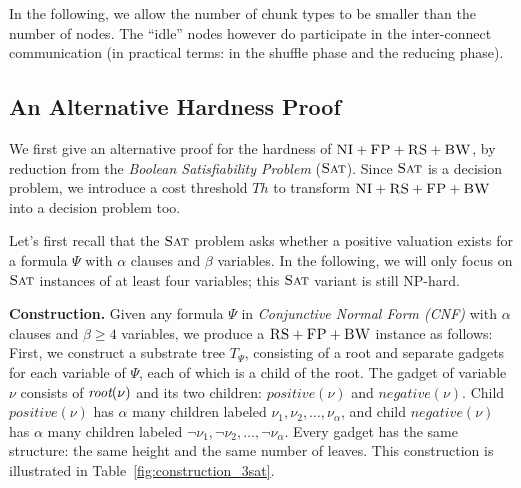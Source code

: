 \documentclass[preprint,12pt]{elsarticle}
\newcommand{\maciek}[1]{\textcolor{brown}{maciek: #1}}
\newcommand{\variab}{\nu}
\newcommand{\aroot}{\emph{root}}
\newcommand{\clauses}{\alpha}
\newcommand{\variables}{\beta}
\newcommand{\CC}{\textsc{NI}}
\newcommand{\FP}{\textsc{FP}}
\newcommand{\RS}{\textsc{RS}}
\newcommand{\BW}{\textsc{BW}}
\newcommand{\MA}{\textsc{MA}}
\newcommand{\Tree}{\ensuremath{T}}
\newcommand{\SAT}{\textsc{Sat}}
\newcommand{\Formula}{\ensuremath{\Psi}}
\newcommand{\Thr}{\ensuremath{Th}}
\newcommand{\positive}{\ensuremath{positive}}
\newcommand{\negative}{\ensuremath{negative}}
\begin{document}
In the following, we allow the number of chunk types to be smaller than the number of nodes.
 The ``idle'' nodes however do participate in the inter-connect communication (in practical terms: in the shuffle phase
 and the reducing phase).



\subsection{An Alternative Hardness Proof}

We first give an alternative proof for the hardness of $\CC+\FP+\RS+\BW$,
by reduction from the \emph{Boolean Satisfiability Problem} ($\SAT$).
Since $\SAT$ is a decision
problem, we
introduce a cost threshold $\Thr$ to transform $\CC+\RS+\FP+\BW$ into a decision problem too.

Let's first recall that the $\SAT$ problem asks whether a positive valuation exists
for a formula $\Formula$ with $\clauses$ clauses and $\variables$
variables.
In the following, we will only focus on $\SAT$ instances of at least four variables;
this $\SAT$ variant is still NP-hard.

\textbf{Construction.}
Given any formula $\Formula$ in \emph{Conjunctive Normal Form (CNF)} with
$\clauses$ clauses and $\variables \geq 4$ variables, we produce
a $\RS+\FP+\BW$ instance as follows: First, we construct a substrate tree
$\Tree_{\Formula}$, consisting of
a root and separate gadgets for each variable of $\Formula$, each of which
is a child of the root.
The gadget of variable $\variab$ consists of $\aroot(\variab)$ and its two children:
$\positive(\variab)$ and $\negative(\variab)$. Child $\positive(\variab)$ has $\clauses$
many children labeled $\nu_1, \nu_2, \ldots,
\nu_{\clauses}$, and child
$\negative(\variab)$ has
$\clauses$ many children labeled $\neg \nu_1, \neg \nu_2, \dots,
\neg \nu_{\clauses}$. Every
gadget has the same structure: the same height and the same number of
leaves. This construction is illustrated in
Table~\ref{fig:construction_3sat}.
\end{document}
